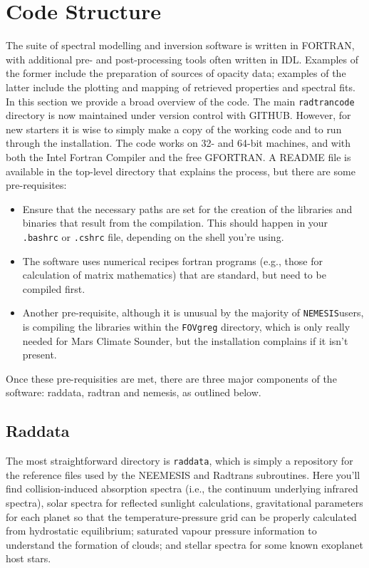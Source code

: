 \documentclass[final,5p,times,twocolumn,authoryear]{elsarticle}
\begin{document}
\section{Code Structure}

The suite of spectral modelling and inversion software is written in FORTRAN, with additional pre- and post-processing tools often written in IDL.  Examples of the former include the preparation of sources of opacity data; examples of the latter include the plotting and mapping of retrieved properties and spectral fits.  In this section we provide a broad overview of the code.  The main \verb#radtrancode# directory is now maintained under version control with GITHUB.  However, for new starters it is wise to simply make a copy of the working code and to run through the installation.  The code works on 32- and 64-bit machines, and with both the Intel Fortran Compiler and the free GFORTRAN.  A README file is available in the top-level directory that explains the process, but there are some pre-requisites:

\begin{itemize}
\item Ensure that the necessary paths are set for the creation of the libraries and binaries that result from the compilation.  This should happen in your \verb#.bashrc# or \verb#.cshrc# file, depending on the shell you're using.
\item The software uses numerical recipes fortran programs (e.g., those for calculation of matrix mathematics) that are standard, but need to be compiled first.
\item Another pre-requisite, although it is unusual by the majority of \verb#NEMESIS#users, is compiling the libraries within the \verb#FOVgreg# directory, which is only really needed for Mars Climate Sounder, but the installation complains if it isn't present.
\end{itemize}

Once these pre-requisities are met, there are three major components of the software:  raddata, radtran and nemesis, as outlined below.

\subsection{Raddata}

The most straightforward directory is \verb#raddata#, which is simply a repository for the reference files used by the NEEMESIS and Radtrans subroutines.  Here you'll find collision-induced absorption spectra (i.e., the continuum underlying  infrared spectra), solar spectra for reflected sunlight calculations, gravitational parameters for each planet so that the temperature-pressure grid can be properly calculated from hydrostatic equilibrium; saturated vapour pressure information to understand the formation of clouds; and stellar spectra for some known exoplanet host stars.
\end{document}
